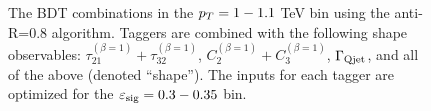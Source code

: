 \begin{figure}
\caption{The BDT combinations in the $p_T = 1-1.1$ TeV bin using the anti-\kT R=0.8 algorithm. Taggers are combined with the following shape observables: $\tau_{21}^{(\beta=1)}+\tau_{32}^{(\beta=1)}$, $C_{2}^{(\beta=1)}+C_{3}^{(\beta=1)}$, $\Gamma_{\rm Qjet}$, and all of the above (denoted ``shape''). The inputs for each tagger are optimized for the $\varepsilon_{\rm sig}=0.3-0.35$ bin.}
\label{fig:pt1000_allcompare_AKt_R08_eps0_35}
\end{figure}

